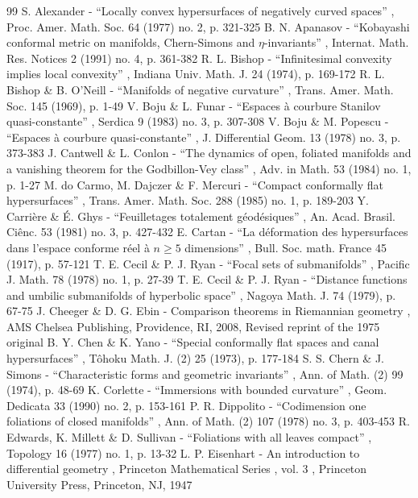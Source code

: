 \begin{thebibliography}{99}
 S. Alexander - “Locally convex hypersurfaces of negatively curved spaces” , Proc. Amer. Math. Soc. 64 (1977) no. 2, p. 321-325
 B. N. Apanasov - “Kobayashi conformal metric on manifolds, Chern-Simons and $\eta $-invariants” , Internat. Math. Res. Notices 2 (1991) no. 4, p. 361-382
 R. L. Bishop - “Infinitesimal convexity implies local convexity” , Indiana Univ. Math. J. 24 (1974), p. 169-172
 R. L. Bishop \& B. O’Neill - “Manifolds of negative curvature” , Trans. Amer. Math. Soc. 145 (1969), p. 1-49
 V. Boju \& L. Funar - “Espaces à courbure Stanilov quasi-constante” , Serdica 9 (1983) no. 3, p. 307-308
 V. Boju \& M. Popescu - “Espaces à courbure quasi-constante” , J. Differential Geom. 13 (1978) no. 3, p. 373-383
 J. Cantwell \& L. Conlon - “The dynamics of open, foliated manifolds and a vanishing theorem for the Godbillon-Vey class” , Adv. in Math. 53 (1984) no. 1, p. 1-27
 M. do Carmo, M. Dajczer \& F. Mercuri - “Compact conformally flat hypersurfaces” , Trans. Amer. Math. Soc. 288 (1985) no. 1, p. 189-203
 Y. Carrière \& É. Ghys - “Feuilletages totalement géodésiques” , An. Acad. Brasil. Ciênc. 53 (1981) no. 3, p. 427-432
 E. Cartan - “La déformation des hypersurfaces dans l’espace conforme réel à $n \ge 5$ dimensions” , Bull. Soc. math. France 45 (1917), p. 57-121
 T. E. Cecil \& P. J. Ryan - “Focal sets of submanifolds” , Pacific J. Math. 78 (1978) no. 1, p. 27-39
 T. E. Cecil \& P. J. Ryan - “Distance functions and umbilic submanifolds of hyperbolic space” , Nagoya Math. J. 74 (1979), p. 67-75
 J. Cheeger \& D. G. Ebin - Comparison theorems in Riemannian geometry , AMS Chelsea Publishing, Providence, RI, 2008, Revised reprint of the 1975 original
 B. Y. Chen \& K. Yano - “Special conformally flat spaces and canal hypersurfaces” , Tôhoku Math. J. (2) 25 (1973), p. 177-184
 S. S. Chern \& J. Simons - “Characteristic forms and geometric invariants” , Ann. of Math. (2) 99 (1974), p. 48-69
 K. Corlette - “Immersions with bounded curvature” , Geom. Dedicata 33 (1990) no. 2, p. 153-161
 P. R. Dippolito - “Codimension one foliations of closed manifolds” , Ann. of Math. (2) 107 (1978) no. 3, p. 403-453
 R. Edwards, K. Millett \& D. Sullivan - “Foliations with all leaves compact” , Topology 16 (1977) no. 1, p. 13-32
 L. P. Eisenhart - An introduction to differential geometry , Princeton Mathematical Series , vol. 3 , Princeton University Press, Princeton, NJ, 1947

\end{thebibliography}
